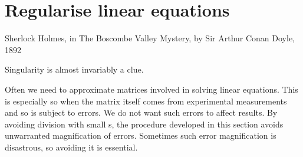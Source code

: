 

\section{Regularise linear equations}
\label{sec:rle}
\secttoc

\begin{quoted}{\parbox{15em}{Sherlock Holmes, in The Boscombe Valley Mystery, by Sir Arthur Conan Doyle, 1892}}
Singularity is almost invariably a clue.
\end{quoted}


Often we need to approximate matrices involved in solving linear equations.  
This is especially so when the matrix itself comes from experimental measurements and so is subject to errors.
We do not want such errors to affect results.
By avoiding division with small s, the procedure developed in this section avoids unwarranted magnification of errors.
Sometimes such error magnification is disastrous, so avoiding it is essential.

